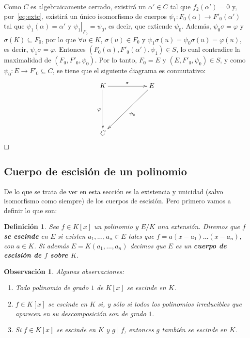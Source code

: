 \documentclass[12pt]{article}
\newtheorem{definition}[theorem]{Definición}
\newtheorem{observation}{Observación}[theorem]
\begin{document}
Como $C$ es algebraicamente cerrado, existirá un $\alpha' \in C$ tal que $f_{2}(\alpha') = 0$ y, por~\ref{eq:extc}, existirá un único isomorfismo de cuerpos $\psi_{1} \colon F_{0}(\alpha) \longrightarrow F'_{0}(\alpha')$ tal que $\psi_{1}(\alpha) = \alpha'$ y $\left.\psi_{1} \right|_{F_{0}} = \psi_{0}$, es decir, que extiende $\psi_{0}$. Además, $\psi_{0}\sigma = \varphi$ y $\sigma(K) \subseteq F_{0}$, por lo que $\forall u \in K$, $\sigma(u) \in F_{0}$ y $\psi_{1}\sigma(u) = \psi_{0}\sigma(u) = \varphi(u)$, es decir, $\psi_{1}\sigma = \varphi$. Entonces $(F_{0}(\alpha), F'_{0}(\alpha'), \psi_{1}) \in S$, lo cual contradice la maximalidad de $(F_{0}, F'_{0}, \psi_{0})$. Por lo tanto, $F_{0} = E$ y $(E, F'_{0}, \psi_{0}) \in S$, y como $\psi_{0} \colon E \longrightarrow F'_{0} \subseteq C$, se tiene que el siguiente diagrama es conmutativo:
$$\xymatrix @=2cm {K \ar[r]^{\sigma} \ar[d]_{\varphi} & E\ar[ld]^{\psi_{0}}  \\ C   }$$

$\hfill \square$

\subsection{Cuerpo de escisión de un polinomio}
De lo que se trata de ver en esta sección es la existencia y unicidad (salvo isomorfismo como siempre) de los cuerpos de escisión. Pero primero vamos a definir lo que son:

\begin{definition} Sea $f \in K[x]$ un polinomio y $E/K$ una extensión. Diremos que $f$ \textbf{se escinde} en $E$ si existen $a_{1}, \ldots, a_{n} \in E$ tales que $f = a(x-a_{1}) \ldots (x-a_{n})$, con $a \in K$. Si además $E = K(a_{1}, \ldots, a_{n})$ decimos que $E$ es un \textbf{cuerpo de escisión de $f$ sobre $K$}.
\end{definition}

\begin{observation} Algunas observaciones: 
\begin{enumerate}
\item Todo polinomio de grado $1$ de $K[x]$ se escinde en $K$.
\item $f \in K[x]$ se escinde en $K$ si, y sólo si todos los polinomios irreducibles que aparecen en su descomposición son de grado $1$.
\item Si $f \in K[x]$ se escinde en $K$ y $g \mid f$, entonces $g$ también se escinde en $K$.
\end{enumerate}
\end{observation}
\end{document}
